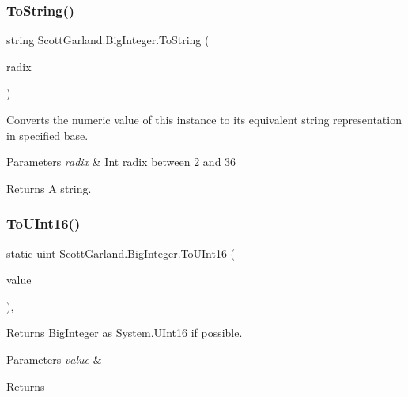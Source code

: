 \subsubsection{\texorpdfstring{To\+String()}{ToString()}\hspace{0.1cm}{\footnotesize\ttfamily [2/2]}}
{\footnotesize\ttfamily string Scott\+Garland.\+Big\+Integer.\+To\+String (\begin{DoxyParamCaption}\item[{int}]{radix }\end{DoxyParamCaption})\hspace{0.3cm}{\ttfamily [inline]}}



Converts the numeric value of this instance to its equivalent string representation in specified base. 


\begin{DoxyParams}{Parameters}
{\em radix} & Int radix between 2 and 36\\
\hline
\end{DoxyParams}
\begin{DoxyReturn}{Returns}
A string.
\end{DoxyReturn}
\mbox{\label{class_scott_garland_1_1_big_integer_a2a619b20c5463022dd1f6d21b3816a22}} 
\subsubsection{\texorpdfstring{To\+U\+Int16()}{ToUInt16()}}
{\footnotesize\ttfamily static uint Scott\+Garland.\+Big\+Integer.\+To\+U\+Int16 (\begin{DoxyParamCaption}\item[{\hyperlink{class_scott_garland_1_1_big_integer}{Big\+Integer}}]{value }\end{DoxyParamCaption})\hspace{0.3cm}{\ttfamily [inline]}, {\ttfamily [static]}}



Returns \hyperlink{class_scott_garland_1_1_big_integer}{Big\+Integer} as System.\+U\+Int16 if possible. 


\begin{DoxyParams}{Parameters}
{\em value} & \\
\hline
\end{DoxyParams}
\begin{DoxyReturn}{Returns}

\end{DoxyReturn}

